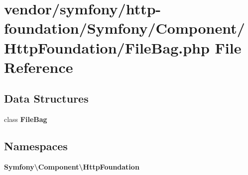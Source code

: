 \section{vendor/symfony/http-\/foundation/\+Symfony/\+Component/\+Http\+Foundation/\+File\+Bag.php File Reference}
\label{_file_bag_8php}
\subsection*{Data Structures}
\begin{DoxyCompactItemize}
\item 
class {\bf File\+Bag}
\end{DoxyCompactItemize}
\subsection*{Namespaces}
\begin{DoxyCompactItemize}
\item 
 {\bf Symfony\textbackslash{}\+Component\textbackslash{}\+Http\+Foundation}
\end{DoxyCompactItemize}
